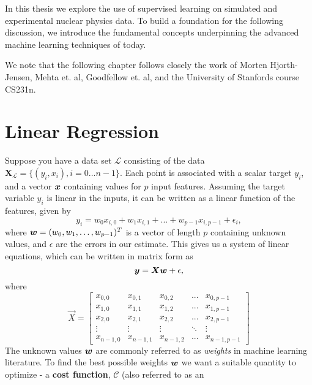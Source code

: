 In this thesis we explore the use of supervised learning on simulated and experimental
nuclear physics data. To build a foundation for the following discussion, we introduce
the fundamental concepts underpinning the advanced machine learning techniques of
today.

We note that the following chapter follows closely the work of 
Morten Hjorth-Jensen\cite{mhjensen-fys4155-notes}, Mehta et. al\cite{Mehta2019},
Goodfellow et. al\cite{Goodfellow-et-al-2016}, and the University of Stanfords
course CS231n\cite{cs231n}.
\section{Linear Regression}\label{sec:linreg}
Suppose you have a data set $\mathcal{L}$ consisting of the data
$\mathbf{X}_\mathcal{L}=\{(y_i, x_i), i=0\ldots n-1\}$. Each point is associated
with a scalar target $y_i$, and a vector ${\boldsymbol{x}}$ containing values for $p$ input
features. Assuming the target variable $y_i$ is linear in the inputs, it can be
written as a linear function of the features, given by
\begin{equation}\label{eq:ols-target}
y_i = w_0 x_{i,0} + w_1 x_{i,1} + ... + w_{p-1} x_{i, p-1} + \epsilon_i,
\end{equation}
where ${\boldsymbol{w}} = (w_0, w_1, \dots, w_{p-1})^T$ is a vector of length
$p$ containing unknown values, and $\epsilon$ are the errors in our estimate.
This gives us a system of linear equations, which can be written in matrix form as
\begin{equation}\label{eq:ols-target-mat}
  {\boldsymbol{y}} = {\boldsymbol{Xw}} + {\boldsymbol{}}{\epsilon},
\end{equation}
where
\begin{equation}
\vec{X} = \left[
\begin{matrix}
x_{0,0} & x_{0,1} & x_{0,2} & ... & x_{0,p-1}\\
x_{1,0} & x_{1,1} & x_{1,2} & ... & x_{1,p-1}\\
x_{2,0} & x_{2,1} & x_{2,2} & ... & x_{2,p-1}\\
\vdots & \vdots & \vdots & \ddots & \vdots\\
x_{n-1,0} & x_{n-1,1} & x_{n-1,2} & ... & x_{n-1,p-1}
\end{matrix}
\right]
\end{equation}
The unknown values ${\boldsymbol{w}}$ are commonly referred to as \textit{weights} in machine 
learning literature. To find the best possible weights ${\boldsymbol{w}}$ we want a suitable
quantity to optimize - a \textbf{cost function}, $\mathcal{C}$ (also referred to as an
